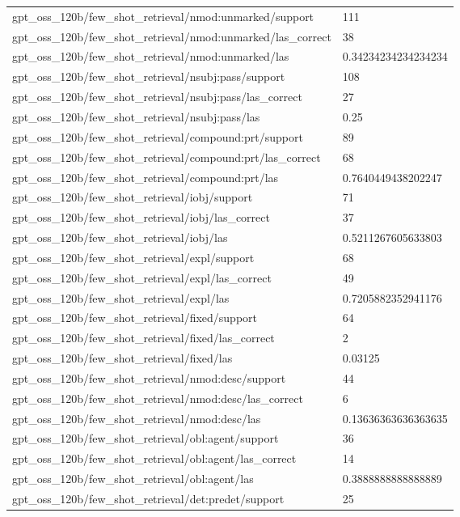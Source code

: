 \begin{tabular}{ll}
gpt\_oss\_120b/few\_shot\_retrieval/nmod:unmarked/support & 111 \\
gpt\_oss\_120b/few\_shot\_retrieval/nmod:unmarked/las\_correct & 38 \\
gpt\_oss\_120b/few\_shot\_retrieval/nmod:unmarked/las & 0.34234234234234234 \\
gpt\_oss\_120b/few\_shot\_retrieval/nsubj:pass/support & 108 \\
gpt\_oss\_120b/few\_shot\_retrieval/nsubj:pass/las\_correct & 27 \\
gpt\_oss\_120b/few\_shot\_retrieval/nsubj:pass/las & 0.25 \\
gpt\_oss\_120b/few\_shot\_retrieval/compound:prt/support & 89 \\
gpt\_oss\_120b/few\_shot\_retrieval/compound:prt/las\_correct & 68 \\
gpt\_oss\_120b/few\_shot\_retrieval/compound:prt/las & 0.7640449438202247 \\
gpt\_oss\_120b/few\_shot\_retrieval/iobj/support & 71 \\
gpt\_oss\_120b/few\_shot\_retrieval/iobj/las\_correct & 37 \\
gpt\_oss\_120b/few\_shot\_retrieval/iobj/las & 0.5211267605633803 \\
gpt\_oss\_120b/few\_shot\_retrieval/expl/support & 68 \\
gpt\_oss\_120b/few\_shot\_retrieval/expl/las\_correct & 49 \\
gpt\_oss\_120b/few\_shot\_retrieval/expl/las & 0.7205882352941176 \\
gpt\_oss\_120b/few\_shot\_retrieval/fixed/support & 64 \\
gpt\_oss\_120b/few\_shot\_retrieval/fixed/las\_correct & 2 \\
gpt\_oss\_120b/few\_shot\_retrieval/fixed/las & 0.03125 \\
gpt\_oss\_120b/few\_shot\_retrieval/nmod:desc/support & 44 \\
gpt\_oss\_120b/few\_shot\_retrieval/nmod:desc/las\_correct & 6 \\
gpt\_oss\_120b/few\_shot\_retrieval/nmod:desc/las & 0.13636363636363635 \\
gpt\_oss\_120b/few\_shot\_retrieval/obl:agent/support & 36 \\
gpt\_oss\_120b/few\_shot\_retrieval/obl:agent/las\_correct & 14 \\
gpt\_oss\_120b/few\_shot\_retrieval/obl:agent/las & 0.3888888888888889 \\
gpt\_oss\_120b/few\_shot\_retrieval/det:predet/support & 25 \\

\end{tabular}
